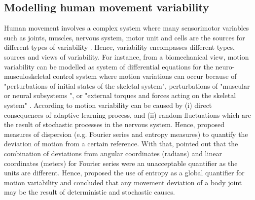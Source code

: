 \subsection{Modelling human movement variability}
Human movement involves a complex system where many sensorimotor 
variables such as joints, muscles, nervous system, motor unit and cells 
are the sources for different types of variability \citep{newell1993}.
Hence, variability encompasses different types, sources and views of 
variability.
For instance, from a biomechanical view, motion variability can be modelled
as system of differential equations for the neuro-musculoskeletal 
control system where motion variations can occur because of 
"perturbations of initial states of the skeletal system",
perturbations of "muscular or neural subsystems ",
or "external torques and forces acting on the skeletal system" 
\citep[p. 13]{hatze1986}.
According to \cite{hatze1986} motion variability can be caused by 
(i) direct consequences of adaptive learning process, and 
(ii) random fluctuations which are the result of stochastic processes 
in the nervous system. Hence, \cite{hatze1986} proposed measures of 
dispersion (e.g. Fourier series and entropy measures) to quantify the 
deviation of motion from a certain reference. With that, 
\cite{hatze1986} pointed out that the combination of deviations from 
angular coordinates (radians) and linear coordinates (meters)
for Fourier series were an unacceptable quantifier as the units are different.
Hence, \cite{hatze1986} proposed the use of entropy as a global quantifier 
for motion variability and concluded that any movement deviation of a 
body joint may be the result of deterministic and stochastic causes.

